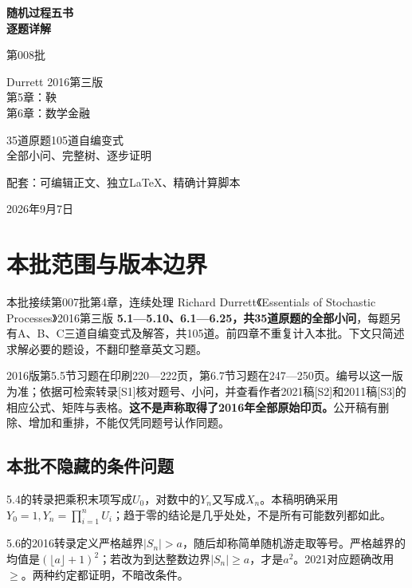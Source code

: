 \documentclass[11pt,a4paper,UTF8,fontset=fandol]{ctexart}
\begin{document}
\begin{titlepage}
\vspace*{18mm}
{\Huge\bfseries 随机过程五书\\逐题详解\par}
\vspace{14mm}
{\LARGE 第008批\par}
\vspace{8mm}
{\Large Durrett 2016第三版\\第5章：鞅\\第6章：数学金融\par}
\vspace{12mm}
{\large 35道原题\quad 105道自编变式\\全部小问、完整树、逐步证明\par}
\vfill
{\large 配套：可编辑正文、独立LaTeX、精确计算脚本\par}
\vspace{6mm}
{2026年9月7日\par}
\end{titlepage}
\tableofcontents\clearpage
\section{本批范围与版本边界}\label{ux672cux6279ux8303ux56f4ux4e0eux7248ux672cux8fb9ux754c}

本批接续第007批第4章，连续处理 Richard Durrett《Essentials of Stochastic
Processes》2016第三版
\textbf{5.1---5.10、6.1---6.25，共35道原题的全部小问}，每题另有A、B、C三道自编变式及解答，共105道。前四章不重复计入本批。下文只简述求解必要的题设，不翻印整章英文习题。

2016版第5.5节习题在印刷220---222页，第6.7节习题在247---250页。编号以这一版为准；依据可检索转录{[}S1{]}核对题号、小问，并查看作者2021稿{[}S2{]}和2011稿{[}S3{]}的相应公式、矩阵与表格。\textbf{这不是声称取得了2016年全部原始印页。}公开稿有删除、增加和重排，不能仅凭同题号认作同题。

\subsection{本批不隐藏的条件问题}\label{ux672cux6279ux4e0dux9690ux85cfux7684ux6761ux4ef6ux95eeux9898}

5.4的转录把乘积末项写成\(U_0\)，对数中的\(Y_n\)又写成\(X_n\)。本稿明确采用\(Y_0=1,Y_n=\prod_{i=1}^nU_i\)；趋于零的结论是几乎处处，不是所有可能数列都如此。

5.6的2016转录定义严格越界\(|S_n|>a\)，随后却称简单随机游走取等号。严格越界的均值是\((\lfloor a\rfloor+1)^2\)；若改为到达整数边界\(|S_n|\ge a\)，才是\(a^2\)。2021对应题确改用\(\ge\)。两种约定都证明，不暗改条件。
\end{document}
